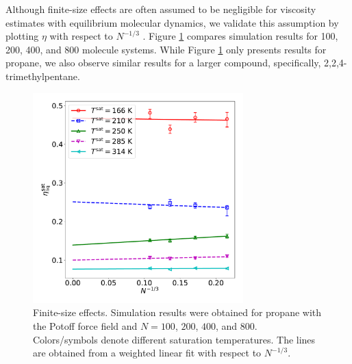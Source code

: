\documentclass[preprint,review,12pt]{elsarticle}
\begin{document}
	Although finite-size effects are often assumed to be negligible for viscosity estimates with equilibrium molecular dynamics, we validate this assumption by plotting $\eta$ with respect to $N^{-1/3}$ \cite{Maginn2018}. Figure \ref{fig:finite_size_effects} compares simulation results for 100, 200, 400, and 800 molecule systems. While Figure \ref{fig:finite_size_effects} only presents results for propane, we also observe similar results for a larger compound, specifically, 2,2,4-trimethylpentane.
	
	
	
	
	\begin{figure}[htb!]
		\centering
		\includegraphics[width=3.2in]{C3H8_Potoff_finite_size_effects.pdf}
		\caption{Finite-size effects. Simulation results were obtained for propane with the Potoff force field and $N= 100$, $200$, $400$, and $800$. Colors/symbols denote different saturation temperatures. The lines are obtained from a weighted linear fit with respect to $N^{-1/3}$.}
		\label{fig:finite_size_effects}
	\end{figure} 
	
\end{document}
